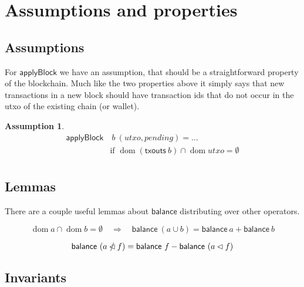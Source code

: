 \documentclass{article}
\newcommand{\restrictdom}{\lhd}
\newcommand{\subtractdom}{\mathbin{\slashed{\restrictdom}}}
\DeclareMathOperator{\dom}{dom}
\newtheorem{assumption}{Assumption}
\begin{document}
\section{Assumptions and properties}

\subsection{Assumptions}

For $\mathsf{applyBlock}$ we have an assumption, that should be a
straightforward property of the blockchain. Much like the two properties above
it simply says that new transactions in a new block should have transaction
ids that do not occur in the utxo of the existing chain (or wallet).

\begin{assumption}
\begin{equation*}
\begin{split}
\mathsf{applyBlock} & ~ b ~ (utxo, pending) = \ldots \\
& \text{if } \dom (\mathsf{txouts} ~ b) \cap \dom utxo = \emptyset \\
\end{split}
\end{equation*}
\label{applyBlock_assumption}
\end{assumption}


\subsection{Lemmas}

There are a couple useful lemmas about $\mathsf{balance}$ distributing over
other operators.

\begin{equation} \label{lemma_balance_minus}
  \dom a \cap \dom b = \emptyset \quad \Longrightarrow \quad
  \mathsf{balance} ~ (a \cup b) = \mathsf{balance} ~ a + \mathsf{balance} ~ b
\end{equation}

\begin{equation} \label{lemma_balance_union}
  \mathsf{balance} ~ (a \subtractdom f) = \mathsf{balance} ~ f - \mathsf{balance} ~ (a \restrictdom f) \\
\end{equation}


\subsection{Invariants}
\label{sec:invariants}
\end{document}
